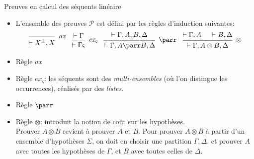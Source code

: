 \documentclass{beamer}
\newcommand*{\orth}{^\perp}
\newcommand*{\tensor}{\otimes}
\newcommand*{\hypv}[1]{\hypo{\vdash #1}}
\newcommand*{\axv}[1]{\infer{0}[\ensuremath{\mathit{ax}}]{\vdash #1}}
\newcommand*{\tensorv}[1]{\infer{2}[\ensuremath{\tensor}]{\vdash #1}}
\newcommand*{\parrv}[1]{\infer{1}[\ensuremath{\parr}]{\vdash #1}}
\newcommand*{\permv}[2]{\infer{1}[\ensuremath{\textit{ex}_{#1}}]{\vdash #2}}
\newcommand*{\permapp}[2]{#2 #1}
\newcommand*{\someperm}{\varsigma}
\newcommand*{\sequent}{\Gamma}
\newcommand*{\sequentbis}{\Delta}
\newcommand*{\proofs}{\ensuremath{\mathcal{P}}}
\begin{document}
\begin{frame}{Preuves en calcul des séquents linéaire}
    \begin{itemize}
        \item L'ensemble des preuves \proofs{} est défini par les règles d'induction suivantes:
            \begin{equation*}
            \begin{prooftree}
              \axv{X\orth, X}
            \end{prooftree}
            \; \; \;
            \begin{prooftree}
              \hypv{\sequent}
              \permv{\someperm}{\permapp{\someperm}{\sequent}}
            \end{prooftree}
            \; \; \;
            \begin{prooftree}
              \hypv{\sequent, A, B, \sequentbis}
              \parrv{\sequent, A \parr B, \sequentbis}
            \end{prooftree}
            \; \; \;
            \begin{prooftree}
              \hypv{\sequent, A}
              \hypv{B, \sequentbis}
              \tensorv{\sequent, A \tensor B, \sequentbis}
            \end{prooftree}
            \end{equation*}
            \pause
        \item Règle $\mathit{ax}$
            \pause
        \item Règle $\textit{ex}_{\someperm}$: les séquents sont des \textit{multi-ensembles} (où l'on distingue les occurrences), réalisés par des \textit{listes}.
            \pause
        \item Règle $\parr$
            \pause
        \item Règle $\tensor$: introduit la notion de coût sur les hypothèses.\\
        Prouver $A \tensor B$ revient à prouver $A$ et $B$. Pour prouver $A \tensor B$ à partir d'un ensemble d'hypothèses $\Sigma$, on doit en choisir une partition $\sequent, \sequentbis$, et prouver $A$ avec toutes les hypothèses de $\sequent$, et $B$ avec toutes celles de $\sequentbis$.
    \end{itemize}
\end{frame}
\end{document}
